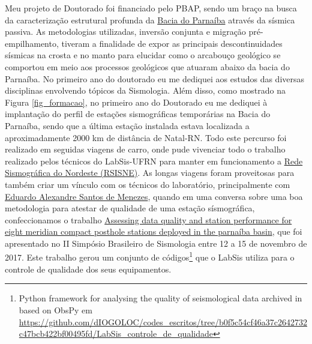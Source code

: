 \documentclass[10pt,a4paper,oneside]{book}
\begin{document}
Meu projeto de Doutorado foi financiado pelo PBAP, sendo um braço na busca da caracterização estrutural profunda da \href{https://www.gov.br/anp/pt-br/rodadas-anp/rodadas-concluidas/concessao-de-blocos-exploratorios/14a-rodada-licitacoes-blocos/arquivos/areas-oferta/sumario-parnaiba.pdf}{Bacia do Parnaíba} através da sísmica passiva. As metodologias utilizadas, inversão conjunta e migração pré-empilhamento, tiveram a finalidade de expor as principais descontinuidades sísmicas na crosta e no manto para elucidar como o arcabouço geológico se comportou em meio aos processos geológicos que atuaram abaixo da bacia do Parnaíba. No primeiro ano do doutorado eu me dediquei aos estudos das diversas disciplinas envolvendo tópicos da Sismologia. Além disso, como mostrado na Figura \ref{fig_formacao}, no primeiro ano do Doutorado eu me dediquei à implantação do perfil de estações sismográficas temporárias na Bacia do Parnaíba, sendo que a última estação instalada estava localizada a aproximadamente 2000 km de distância de Natal-RN. Todo este percurso foi realizado em seguidas viagens de carro, onde pude vivenciar todo o trabalho realizado pelos técnicos do LabSis-UFRN para manter em funcionamento a \href{https://labsis.ufrn.br/}{Rede Sismográfica do Nordeste (RSISNE)}. As longas viagens foram proveitosas para também criar um vínculo com os técnicos do laboratório, principalmente com \href{http://lattes.cnpq.br/0406798380417692}{Eduardo Alexandre Santos de Menezes}, quando em uma conversa sobre uma boa metodologia para atestar de qualidade de uma estação sísmográfica, confeccionamos o trabalho \href{https://dx.doi.org/10.6084/m9.figshare.25367143}{Assessing data quality and station performance for eight meridian compact posthole stations deployed in the parnaíba basin}, que foi apresentado no II Simpósio Brasileiro de Sismologia entre 12 a 15 de novembro de 2017. Este trabalho gerou um conjunto de códigos\footnote{Python framework for analysing the quality of seismological data archived in based on ObsPy em \url{https://github.com/dIOGOLOC/codes_escritos/tree/b0f5c54cf46a37c2642732c47bcb422bf00495fd/LabSis_controle_de_qualidade}} que o LabSis utiliza para o controle de qualidade dos seus equipamentos.  
\end{document}
